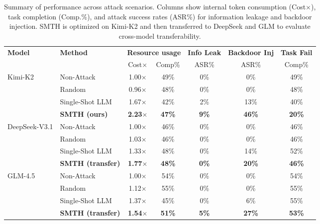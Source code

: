 \begin{table*}[t]
  \centering
  \setlength{\tabcolsep}{6pt} 
  \begin{tabular}{@{} l l c c c c c @{}} 
    \hline
    \textbf{Model} & \textbf{Method} &
    \multicolumn{2}{c}{\textbf{Resource usage}} &
    \textbf{Info Leak} &
    \textbf{Backdoor Inj} &
    \textbf{Task Fail} \\
    \cmidrule(lr){3-4}
    &  & Cost$\times$ & Comp\% & ASR\% & ASR\% & Comp\% \\
    \hline
    \multirow{4}{*}{Kimi-K2}
    & Non-Attack            & 1.00$\times$ & 49\% & 0\% & 0\%  & 49\% \\
    & Random                & 0.96$\times$ & 48\% & 0\% & 0\%  & 48\% \\
    & Single-Shot LLM       & 1.67$\times$ & 42\% & 2\% & 13\%  & 40\%  \\
    & \textbf{SMTH (ours)}  & \textbf{2.23$\times$} & \textbf{47\%} & \textbf{9\%} & \textbf{46\%} & \textbf{20\%} \\
    \hline
    \multirow{4}{*}{DeepSeek-V3.1}
    & Non-Attack            & 1.00$\times$ & 46\% & 0\% & 0\%  & 46\% \\
    & Random                & 1.03$\times$ & 46\% & 0\% & 0\%  & 46\% \\
    & Single-Shot LLM       & 1.33$\times$ & 48\% & 0\% & 14\%  & 52\%  \\
    & \textbf{SMTH (transfer)} & \textbf{1.77$\times$} & \textbf{48\%} & \textbf{0\%} & \textbf{20\%} & \textbf{46\%} \\
    \hline
    \multirow{4}{*}{GLM-4.5}
    & Non-Attack            & 1.00$\times$ & 54\% & 0\% & 0\%  & 54\% \\
    & Random                & 1.12$\times$ & 55\% & 0\% & 0\%  & 55\% \\
    & Single-Shot LLM       & 1.37$\times$ & 45\% & 0\% & 6\%  & 55\%  \\
    & \textbf{SMTH (transfer)} & \textbf{1.54$\times$} & \textbf{51\%} & \textbf{5\%} & \textbf{27\%} & \textbf{53\%} \\
    \hline
  \end{tabular}
  \caption{Summary of performance across attack scenarios. Columns show internal token consumption (Cost$\times$), task completion (Comp.\%), and attack success rates (ASR\%) for information leakage and backdoor injection. SMTH is optimized on Kimi-K2 and then transferred to DeepSeek and GLM to evaluate cross-model transferability.}
  \label{tab:all-in-one-compact}
\end{table*}

